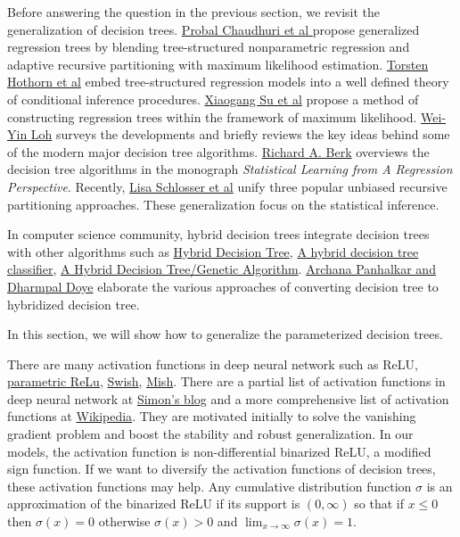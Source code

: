 \documentclass[UTF8]{article}
\begin{document}
Before answering the question in the previous section, we revisit the generalization of decision trees.
\href{http://pages.stat.wisc.edu/~loh/treeprogs/guide/grapes.pdf}{Probal Chaudhuri et al }
propose generalized regression trees
by blending tree-structured nonparametric regression and
adaptive recursive partitioning with maximum likelihood estimation.
\href{https://epub.wu.ac.at/676/1/document.pdf}{Torsten Hothorn et al} embed tree-structured regression models
into a well defined theory of conditional inference procedures.
\href{https://www.researchgate.net/publication/261660212_Maximum_Likelihood_Regression_Trees}{Xiaogang Su et al}
propose a method of constructing regression trees within the framework of maximum likelihood.
\href{http://pages.stat.wisc.edu/~loh/treeprogs/guide/LohISI14.pdf}{Wei-Yin Loh}
surveys the developments and briefly reviews
the key ideas behind some of the modern major decision tree algorithms.
\href{https://www.researchgate.net/profile/Richard_Berk}{Richard A. Berk} overviews the decision tree algorithms
in the monograph \emph{Statistical Learning from A Regression Perspective}.
Recently, \href{https://arxiv.org/abs/1906.10179}{Lisa Schlosser et al}
unify three popular  unbiased recursive partitioning approaches.
These generalization focus on the statistical inference.

In computer science community, hybrid decision trees integrate decision trees with other algorithms such as
\href{https://cs.nju.edu.cn/zhouzh/zhouzh.files/publication/kbs02.pdf}{Hybrid Decision Tree},
\href{https://dl.acm.org/citation.cfm?id=2596353}{A hybrid decision tree classifier},
\href{https://sci2s.ugr.es/keel/pdf/algorithm/articulo/DT-GA.pdf}{A Hybrid Decision Tree/Genetic Algorithm}.
\href{https://link.springer.com/chapter/10.1007/978-981-10-1678-3_8}{Archana Panhalkar and Dharmpal Doye}
elaborate the various approaches of converting decision tree to hybridized decision tree.

In this section, we will show how to generalize the parameterized decision trees.

There are many activation functions in deep neural network such as
ReLU\cite{dinh2019convergence},
\href{https://arxiv.org/pdf/1502.01852.pdf}{parametric ReLu},
\href{https://arxiv.org/pdf/1710.05941.pdf}{Swish},
\href{https://arxiv.org/abs/1908.08681}{Mish}.
There are a partial list of activation functions in deep neural network at
\href{https://www.simonwenkel.com/2018/05/15/activation-functions-for-neural-networks.html}{Simon's blog}
and a more comprehensive list of activation functions
at \href{https://en.wikipedia.org/wiki/Activation_function}{Wikipedia}.
They are motivated initially to solve the vanishing gradient problem
and boost the stability and robust generalization.
In our models, the activation function is non-differential binarized ReLU, a modified sign function.
If we want to diversify the activation functions of decision trees,
these activation functions may help.
Any cumulative distribution function $\sigma$ is an approximation of the binarized ReLU
if its support is $(0,\infty)$ so that if $x\leq 0$ then $\sigma(x)=0$
otherwise $\sigma(x)>0$ and $\lim_{x\to\infty}\sigma(x)=1$.
\end{document}
